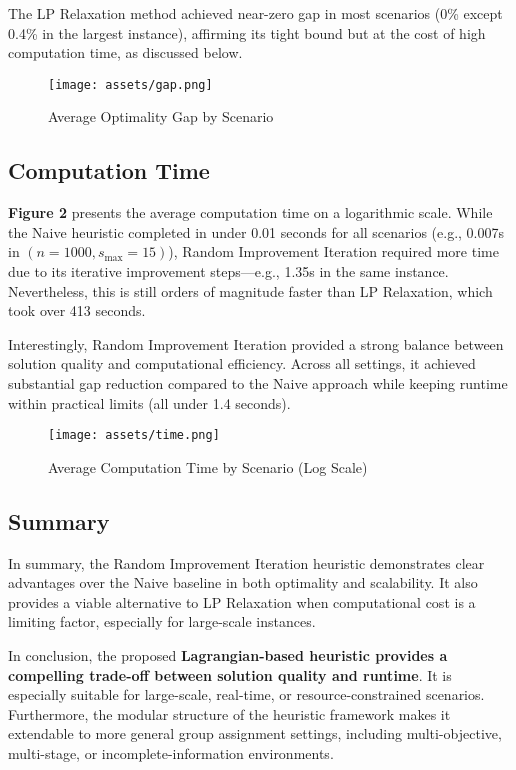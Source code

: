 The LP Relaxation method achieved near-zero gap in most scenarios (0\% except 0.4\% in the largest instance), affirming its tight bound but at the cost of high computation time, as discussed below.

\begin{figure}[H]
    \centering
    \texttt{[image: assets/gap.png]}
    \caption{Average Optimality Gap by Scenario}
    \label{fig:your-label}
\end{figure}

\subsection{Computation Time}

\textbf{Figure 2} presents the average computation time on a logarithmic scale. While the Naive heuristic completed in under 0.01 seconds for all scenarios (e.g., 0.007s in $(n=1000, s_{\max}=15)$), Random Improvement Iteration required more time due to its iterative improvement steps—e.g., 1.35s in the same instance. Nevertheless, this is still orders of magnitude faster than LP Relaxation, which took over 413 seconds.

Interestingly, Random Improvement Iteration provided a strong balance between solution quality and computational efficiency. Across all settings, it achieved substantial gap reduction compared to the Naive approach while keeping runtime within practical limits (all under 1.4 seconds). 

\begin{figure}[H]
    \centering
    \texttt{[image: assets/time.png]}
    \caption{Average Computation Time by Scenario (Log Scale)}
    \label{fig:your-label}
\end{figure}

\subsection{Summary}

In summary, the Random Improvement Iteration heuristic demonstrates clear advantages over the Naive baseline in both optimality and scalability. It also provides a viable alternative to LP Relaxation when computational cost is a limiting factor, especially for large-scale instances.

In conclusion, the proposed \textbf{Lagrangian-based heuristic provides a compelling trade-off between solution quality and runtime}. It is especially suitable for large-scale, real-time, or resource-constrained scenarios. Furthermore, the modular structure of the heuristic framework makes it extendable to more general group assignment settings, including multi-objective, multi-stage, or incomplete-information environments.
